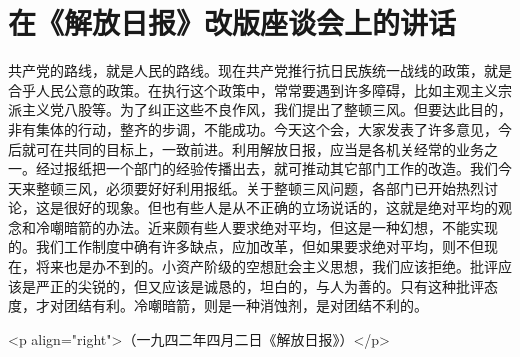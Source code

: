 \section[在《解放日报》改版座谈会上的讲话（一九四二年）]{在《解放日报》改版座谈会上的讲话}

共产党的路线，就是人民的路线。现在共产党推行抗日民族统一战线的政策，就是合乎人民公意的政策。在执行这个政策中，常常要遇到许多障碍，比如主观主义宗派主义党八股等。为了纠正这些不良作风，我们提出了整顿三风。但要达此目的，非有集体的行动，整齐的步调，不能成功。今天这个会，大家发表了许多意见，今后就可在共同的目标上，一致前进。利用解放日报，应当是各机关经常的业务之一。经过报纸把一个部门的经验传播出去，就可推动其它部门工作的改造。我们今天来整顿三风，必须要好好利用报纸。关于整顿三风问题，各部门已开始热烈讨论，这是很好的现象。但也有些人是从不正确的立场说话的，这就是绝对平均的观念和冷嘲暗箭的办法。近来颇有些人要求绝对平均，但这是一种幻想，不能实现的。我们工作制度中确有许多缺点，应加改革，但如果要求绝对平均，则不但现在，将来也是办不到的。小资产阶级的空想瓧会主义思想，我们应该拒绝。批评应该是严正的尖锐的，但又应该是诚恳的，坦白的，与人为善的。只有这种批评态度，才对团结有利。冷嘲暗箭，则是一种消蚀剂，是对团结不利的。

<p align="right">（一九四二年四月二日《解放日报》）</p>

